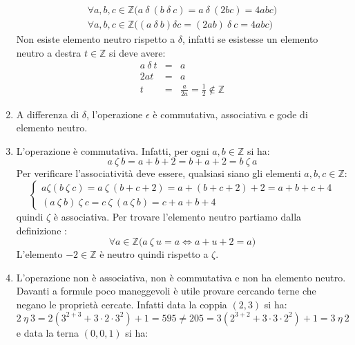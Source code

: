 \begin{enumerate}
\begin{displaymath}
\begin{array}{l}
			\forall a,b,c \in \mathbb{Z} \bigl( a \ \delta \ (b \ \delta \ c) = a \ \delta \ (2bc) = 4abc \bigr)\\
			\forall a,b,c \in \mathbb{Z} \bigl((a \ \delta \ b) \delta c = (2ab) \ \delta \ c = 4abc \bigr)
		\end{array}
	\end{displaymath}
	Non esiste elemento neutro rispetto a $\delta$, infatti se esistesse un elemento neutro a destra $t \in \mathbb{Z}$ si deve avere:
	\begin{eqnarray*}
		a \ \delta \ t &=& a \\
		2at &=& a \\
		t &=& \frac{a}{2a}=\frac{1}{2} \notin \mathbb{Z}
	\end{eqnarray*}
	\item A differenza di $\delta$, l'operazione $\epsilon$ è commutativa, associativa e gode di elemento neutro.
	\item L'operazione è commutativa. Infatti, per ogni $a,b \in \mathbb{Z}$ si ha:
	\begin{displaymath}
		a \ \zeta \ b = a+b+2 = b+a+2 = b  \ \zeta  \ a
	\end{displaymath}
	Per verificare l'associatività deve essere, qualsiasi siano gli elementi $a,b,c \in \mathbb{Z}$:
	\begin{displaymath}
		\begin{cases}
			a \zeta (b \ \zeta \ c) = a \ \zeta \ (b+c+2) = a+(b+c+2)+2=a+b+c+4 \\
			(a \ \zeta \ b) \ \zeta \ c = c \ \zeta \ (a \ \zeta \ b) =c + a + b +4
		\end{cases}
	\end{displaymath}
	quindi $\zeta$ è associativa.
	Per trovare l'elemento neutro partiamo dalla definizione :
	\begin{displaymath}
		\forall a \in \mathbb{Z} \bigl( a \ \zeta \ u = a  \iff a+u+2=a \bigr)
	\end{displaymath}
	L'elemento $-2 \in \mathbb{Z}$ è neutro quindi rispetto a $\zeta$.
	\item L'operazione non è associativa, non è commutativa e non ha elemento neutro. Davanti a formule poco maneggevoli è utile provare cercando terne che negano le proprietà cercate. Infatti data la coppia $(2,3)$ si ha:
	\begin{displaymath}
		2\ \eta \  3 = 2(3^{2+3}+3\cdot2\cdot3^{2})+1=595 \neq 205 = 3(2^{3+2}+3 \cdot 3 \cdot2^{2})+1 = 3 \  \eta \  2
	\end{displaymath}
	e data la terna $(0,0,1)$ si ha:

\end{enumerate}
